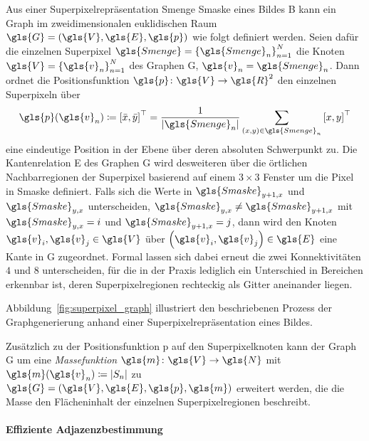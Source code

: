 Aus einer Superpixelrepräsentation \gls{Smenge} \bzw{} \gls{Smaske} eines Bildes \gls{B} kann ein Graph im zweidimensionalen euklidischen Raum $\gls{G}=\left(\gls{V}, \gls{E}, \gls{p}\right)$ wie folgt definiert werden.
Seien dafür die einzelnen Superpixel $\gls{Smenge} = {\left\{\gls{Smenge}_n\right\}}_{n=1}^N$ die Knoten $\gls{V} = {\left\{\gls{v}_n\right\}}_{n=1}^N$ des Graphen \gls{G}, \dhe{} $\gls{v}_n = \gls{Smenge}_n$.
Dann ordnet die Positionsfunktion $\gls{p} \colon \gls{V} \to \gls{R}^2$ den einzelnen Superpixeln über
\begin{equation*}
  \gls{p}\left(\gls{v}_n\right) \coloneqq {\left[\bar{x}, \bar{y}\right]}^{\top} =  \frac{1}{\left|\gls{Smenge}_n\right|}\sum_{\left(x,y\right) \in \gls{Smenge}_n} {\left[x, y\right]}^{\top}
\end{equation*}
eine eindeutige Position in der Ebene über deren absoluten Schwerpunkt zu.
Die Kantenrelation \gls{E} des Graphen \gls{G} wird desweiteren über die örtlichen Nachbarregionen der Superpixel basierend auf einem $3 \times 3$ Fenster um die Pixel in \gls{Smaske} definiert.
Falls sich \bspw{} die Werte in $\gls{Smaske}_{y+1,x}$ und $\gls{Smaske}_{y,x}$ unterscheiden,
\dhe{} $\gls{Smaske}_{y,x} \neq \gls{Smaske}_{y+1,x}$ mit $\gls{Smaske}_{y,x} = i$ und $\gls{Smaske}_{y+1,x}=j$, dann wird den Knoten $\gls{v}_i, \gls{v}_j \in \gls{V}$ über $\left(\gls{v}_i, \gls{v}_j\right) \in \gls{E}$ eine Kante in \gls{G} zugeordnet.
Formal lassen sich dabei erneut die zwei Konnektivitäten $4$ und $8$ unterscheiden, für die in der Praxis lediglich ein Unterschied in Bereichen erkennbar ist, deren Superpixelregionen rechteckig als Gitter aneinander liegen.

Abbildung~\ref{fig:superpixel_graph} illustriert den beschriebenen Prozess der Graphgenerierung anhand einer Superpixelrepräsentation eines Bildes.

Zusätzlich zu der Positionsfunktion \gls{p} auf den Superpixelknoten kann der Graph \gls{G} um eine \emph{Massefunktion} $\gls{m} \colon \gls{V} \to \gls{N}$ mit $\gls{m}\left(\gls{v}_n\right) \coloneqq \left|S_n\right|$ zu $\gls{G} = \left(\gls{V}, \gls{E}, \gls{p}, \gls{m}\right)$ erweitert werden, die die Masse \bzw{} den Flächeninhalt der einzelnen Superpixelregionen beschreibt.

\paragraph{Effiziente Adjazenzbestimmung}
\label{adjazenzbestimmung_superpixel}

